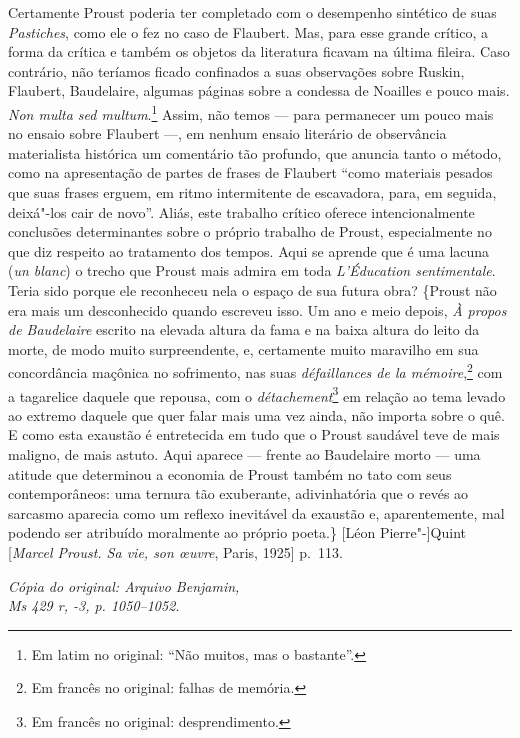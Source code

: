 Certamente Proust poderia ter completado com o desempenho sintético de
suas \emph{Pastiches}, como ele o fez no caso de Flaubert. Mas, para esse
grande crítico, a forma da crítica e também os objetos da literatura
ficavam na última fileira. Caso contrário, não teríamos ficado
confinados a suas observações sobre Ruskin, Flaubert, Baudelaire,
algumas páginas sobre a condessa de Noailles e pouco mais. \emph{Non
multa sed multum}.\footnote{Em latim no original: ``Não muitos,
  mas o bastante''. \versal{[N.~T.]}} Assim, não temos --- para permanecer um pouco mais
no ensaio sobre Flaubert ---, em nenhum ensaio literário de observância
materialista histórica um comentário tão profundo, que anuncia tanto o
método, como na apresentação de partes de frases de Flaubert ``como
materiais pesados que suas frases erguem, em ritmo intermitente de
escavadora, para, em seguida, deixá"-los cair de novo''. Aliás, este
trabalho crítico oferece intencionalmente conclusões determinantes sobre
o próprio trabalho de Proust, especialmente no que diz respeito ao
tratamento dos tempos. Aqui se aprende que é uma lacuna (\emph{un
blanc}) o trecho que Proust mais admira em toda \emph{L'Éducation
sentimentale}. Teria sido porque ele reconheceu nela o espaço de sua
futura obra? \{Proust não era mais um desconhecido quando escreveu isso.
Um ano e meio depois, \emph{À propos de Baudelaire} escrito na
elevada altura da fama e na baixa altura do leito da morte, de modo muito
surpreendente, e, certamente muito maravilho em sua concordância
maçônica no sofrimento, nas suas \emph{défaillances de la
mémoire},\footnote{Em francês no original: falhas de memória. \versal{[N.~T.]}}
com a tagarelice daquele que repousa, com o \emph{détachement}\footnote{Em francês no original: desprendimento. \versal{[N.~T.]}} em
relação ao tema levado ao extremo daquele que quer falar mais uma
vez ainda, não importa sobre o quê. E como esta exaustão é entretecida em
tudo que o Proust saudável teve de mais maligno, de mais astuto. Aqui
aparece --- frente ao Baudelaire morto --- uma atitude que determinou a
economia de Proust também no tato com seus contemporâneos: uma ternura
tão exuberante, adivinhatória que o revés ao sarcasmo aparecia como
um reflexo inevitável da exaustão e, aparentemente, mal podendo ser
atribuído moralmente ao próprio poeta.\} {[}Léon Pierre"-{]}Quint
{[}\emph{Marcel Proust. Sa vie, son \oe uvre}, Paris, 1925{]} p.~113.

\begin{flushright}
\emph{\footnotesize{Cópia do original: Arquivo Benjamin,\\ Ms 429 r, -3, p. 1050--1052.}}
\end{flushright}

